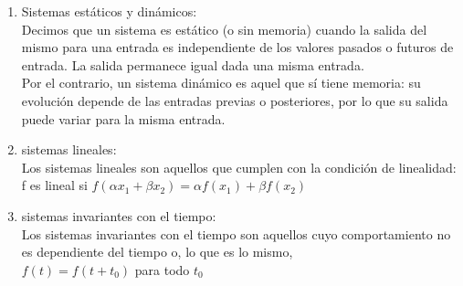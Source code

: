 \documentclass[11pt]{article}
\newcommand{\rta}{\\}
\begin{document}
\begin{enumerate}
    \item Sistemas estáticos y dinámicos:
    \rta Decimos que un sistema es estático (o sin memoria) cuando la salida del mismo para una entrada es independiente de los valores pasados o futuros de entrada. La salida permanece igual dada una misma entrada.
    \rta Por el contrario, un sistema dinámico es aquel que sí tiene memoria: su evolución depende de las entradas previas o posteriores, por lo que su salida puede variar para la misma entrada.

    \item sistemas lineales:
    \rta Los sistemas lineales son aquellos que cumplen con la condición de linealidad: 
        f es lineal si $f(\alpha x_1 + \beta x_2)
    =\alpha f(x_1) + \beta f(x_2)$
    \item sistemas invariantes con el tiempo:
    \rta Los sistemas invariantes con el tiempo son aquellos cuyo comportamiento no es dependiente del tiempo o, lo que es lo mismo,
        \\ $f(t) = f(t+t_0)$ para todo $t_0$

\end{enumerate}
\end{document}
